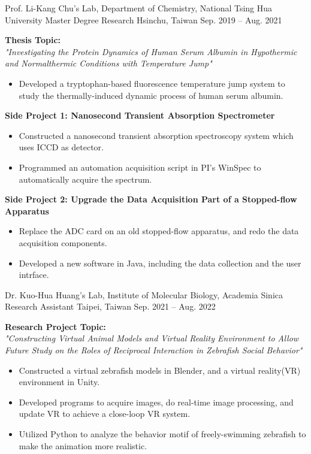 \begin{cventries}
\cventry
{Prof. Li-Kang Chu's Lab, Department of Chemistry, National Tsing Hua University}
{Master Degree Research}
{Hsinchu, Taiwan}
{Sep. 2019 -- Aug. 2021}
{
\textbf{Thesis Topic:}\\
\textit{"Investigating the Protein Dynamics of Human Serum Albumin in Hypothermic and Normalthermic Conditions with Temperature Jump"}
\begin{itemize}
    \item Developed a tryptophan-based fluorescence temperature jump system to study the thermally-induced dynamic process of human serum albumin.
\end{itemize}
\textbf{Side Project 1: Nanosecond Transient Absorption Spectrometer}
\begin{itemize}
    \item Constructed a nanosecond transient absorption spectroscopy system which uses ICCD as detector.
    \item Programmed an automation acquisition script in PI's WinSpec to automatically acquire the spectrum.
\end{itemize}
\textbf{Side Project 2: Upgrade the Data Acquisition Part of a Stopped-flow Apparatus}
\begin{itemize}
    \item Replace the ADC card on an old stopped-flow apparatus, and redo the data acquisition components.
    \item Developed a new software in Java, including the data collection and the user intrface.
\end{itemize}
}

\cventry
{Dr. Kuo-Hua Huang's Lab, Institute of Molecular Biology, Academia Sinica}
{Research Assistant}
{Taipei, Taiwan}
{Sep. 2021 -- Aug. 2022}
{
\textbf{Research Project Topic:}\\
\textit{"Constructing Virtual Animal Models and Virtual Reality Environment to Allow Future Study on the Roles of Reciprocal Interaction in Zebrafish Social Behavior"}
\begin{itemize}
    \item Constructed a virtual zebrafish models in Blender, and a virtual reality(VR) environment in Unity.
    \item Developed programs to acquire images, do real-time image processing, and update VR to achieve a close-loop VR system.
    \item Utilized Python to analyze the behavior motif of freely-swimming zebrafish to make the animation more realistic.
\end{itemize}
}

\end{cventries}

